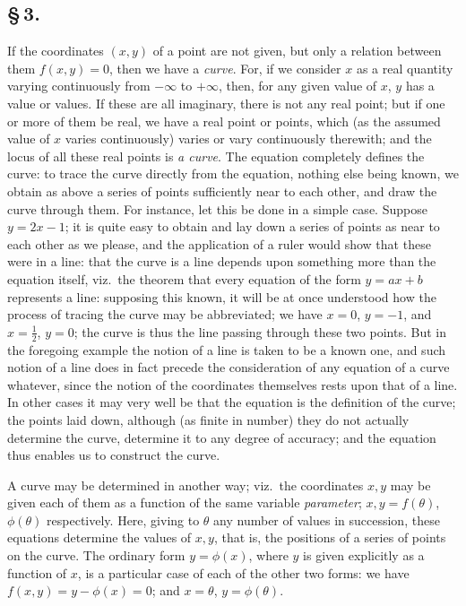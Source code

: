 \documentclass[11pt,a4paper]{book}
\begin{document}
\subsection*{\S\,3.}

If the coordinates $(x, y)$ of a point are not given, but only a relation between them $f(x, y) = 0$, then we have a \textit{curve}. For, if we consider $x$ as a real quantity varying continuously from $-\infty$ to $+\infty$, then, for any given value of $x$, $y$ has a value or values. If these are all imaginary, there is not any real point; but if one or more of them be real, we have a real point or points, which (as the assumed value of $x$ varies continuously) varies or vary continuously therewith; and the locus of all these real points is \textit{a curve}. The equation completely defines the curve: to trace the curve directly from the equation, nothing else being known, we obtain as above a series of points sufficiently near to each other, and draw the curve through them. For instance, let this be done in a simple case. Suppose $y = 2x - 1$; it is quite easy to obtain and lay down a series of points as near to each other as we please, and the application of a ruler would show that these were in a line: that the curve is a line depends upon something more than the equation itself, viz.\ the theorem that every equation of the form $y = ax + b$ represents a line: supposing this known, it will be at once understood how the process of tracing the curve may be abbreviated; we have $x = 0$, $y = -1$, and $x = \frac{1}{2}$, $y = 0$; the curve is thus the line passing through these two points. But in the foregoing example the notion of a line is taken to be a known one, and such notion of a line does in fact precede the consideration of any equation of a curve whatever, since the notion of the coordinates themselves rests upon that of a line. In other cases it may very well be that the equation is the definition of the curve; the points laid down, although (as finite in number) they do not actually determine the curve, determine it to any degree of accuracy; and the equation thus enables us to construct the curve.

A curve may be determined in another way; viz.\ the coordinates $x, y$ may be given each of them as a function of the same variable \textit{parameter}; $x, y = f(\theta)$, $\phi(\theta)$ respectively. Here, giving to $\theta$ any number of values in succession, these equations determine the values of $x, y$, that is, the positions of a series of points on the curve. The ordinary form $y = \phi(x)$, where $y$ is given explicitly as a function of $x$, is a particular case of each of the other two forms: we have $f(x, y) = y - \phi(x) = 0$; and $x = \theta$, $y = \phi(\theta)$.
\end{document}
